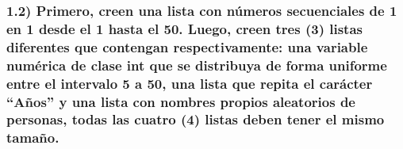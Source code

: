 \documentclass[
]{article}
\begin{document}
\hypertarget{primero-creen-una-lista-con-nuxfameros-secuenciales-de-1-en-1-desde-el-1-hasta-el-50.-luego-creen-tres-3-listas-diferentes-que-contengan-respectivamente-una-variable-numuxe9rica-de-clase-int-que-se-distribuya-de-forma-uniforme-entre-el-intervalo-5-a-50-una-lista-que-repita-el-caruxe1cter-auxf1os-y-una-lista-con-nombres-propios-aleatorios-de-personas-todas-las-cuatro-4-listas-deben-tener-el-mismo-tamauxf1o.}{%
\subsubsection{1.2) Primero, creen una lista con números secuenciales de
1 en 1 desde el 1 hasta el 50. Luego, creen tres (3) listas diferentes
que contengan respectivamente: una variable numérica de clase int que se
distribuya de forma uniforme entre el intervalo 5 a 50, una lista que
repita el carácter ``Años'' y una lista con nombres propios aleatorios
de personas, todas las cuatro (4) listas deben tener el mismo
tamaño.}\label{primero-creen-una-lista-con-nuxfameros-secuenciales-de-1-en-1-desde-el-1-hasta-el-50.-luego-creen-tres-3-listas-diferentes-que-contengan-respectivamente-una-variable-numuxe9rica-de-clase-int-que-se-distribuya-de-forma-uniforme-entre-el-intervalo-5-a-50-una-lista-que-repita-el-caruxe1cter-auxf1os-y-una-lista-con-nombres-propios-aleatorios-de-personas-todas-las-cuatro-4-listas-deben-tener-el-mismo-tamauxf1o.}}
\end{document}
